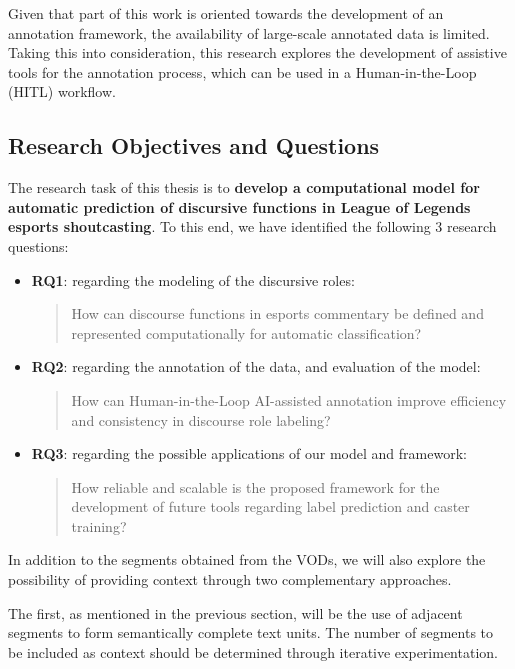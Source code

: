 \medskip

Given that part of this work is oriented towards the development of an annotation framework, the availability of large-scale annotated data is limited. Taking this into consideration, this research explores the development of assistive tools for the annotation process, which can be used in a Human-in-the-Loop (HITL) workflow.

\subsection{Research Objectives and Questions}

The research task of this thesis is to \textbf{develop a computational model for automatic prediction of discursive functions in League of Legends esports shoutcasting}. To this end, we have identified the following 3 research questions:

\begin{itemize}
  \item \textbf{RQ1}: regarding the modeling of the discursive roles:
  \begin{quote}
    How can discourse functions in esports commentary be defined and represented computationally for automatic classification?
  \end{quote}
  \item \textbf{RQ2}: regarding the annotation of the data, and evaluation of the model:
  \begin{quote}
    How can Human-in-the-Loop AI-assisted annotation improve efficiency and consistency in discourse role labeling?
  \end{quote}
  \item \textbf{RQ3}: regarding the possible applications of our model and framework:
  \begin{quote}
    How reliable and scalable is the proposed framework for the development of future tools regarding label prediction and caster training?
  \end{quote}
\end{itemize}

In addition to the segments obtained from the VODs, we will also explore the possibility of providing context through two complementary approaches. 

\medskip

The first, as mentioned in the previous section, will be the use of adjacent segments to form semantically complete text units. The number of segments to be included as context should be determined through iterative experimentation.  

